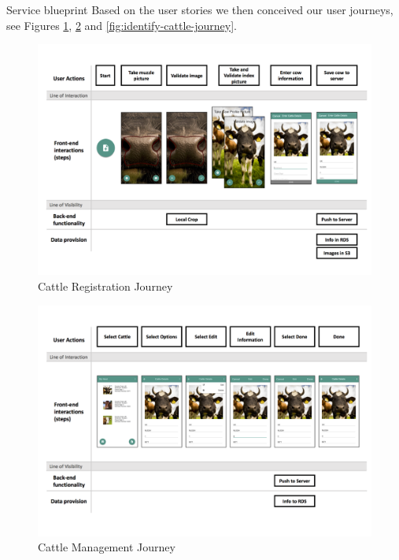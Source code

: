 
\begin{subsection}{Service blueprint}
  Based on the user stories we then conceived our user journeys, see Figures \ref{fig:register-cattle-journey}, \ref{fig:edit-cattle-journey} and \ref{fig:identify-cattle-journey}.
  \begin{figure}
    \includegraphics[width=\textwidth]{images/register-cattle-journey.png}
    \caption{Cattle Registration Journey}
    \label{fig:register-cattle-journey}
  \end{figure}
  \begin{figure}
    \includegraphics[width=\textwidth]{images/edit-cattle-journey.png}
    \caption{Cattle Management Journey}
    \label{fig:edit-cattle-journey}

\end{figure}
\end{subsection}
